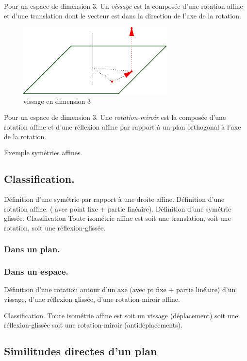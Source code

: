 \begin{defi}[vissage]
 Pour un espace de dimension $3$. Un \emph{vissage} est la composée d'une rotation affine et d'une translation dont le vecteur est dans la direction de l'axe de la rotation. 
\end{defi}
\begin{figure}[ht!]
 \centering
 \includegraphics{C5727_2.pdf}
 \caption{vissage en dimension $3$}
 \label{fig:C5727_2}
\end{figure}

\begin{defi}
 Pour un espace de dimension $3$. Une \emph{rotation-miroir} est la composée d'une rotation affine et d'une réflexion affine par rapport à un plan orthogonal à l'axe de la rotation. 
\end{defi}




Exemple symétries affines.
\subsection{Classification.}
Définition d'une symétrie par rapport à une droite affine. Définition d'une rotation affine. ( avec point fixe + partie linéaire). Définition d'une symétrie glissée.  
Classification Toute isométrie affine est soit une translation, soit une rotation, soit une réflexion-glissée.
\subsubsection{Dans un plan.}
\subsubsection{Dans un espace.}
Définition d'une rotation autour d'un axe (avec pt fixe + partie linéaire) d'un vissage, d'une réflexion glissée, d'une rotation-miroir affine. 

Classification. Toute isométrie affine est soit un vissage (déplacement) soit une réflexion-glissée soit une rotation-miroir (antidéplacements).
\subsection{Similitudes directes d'un plan}

